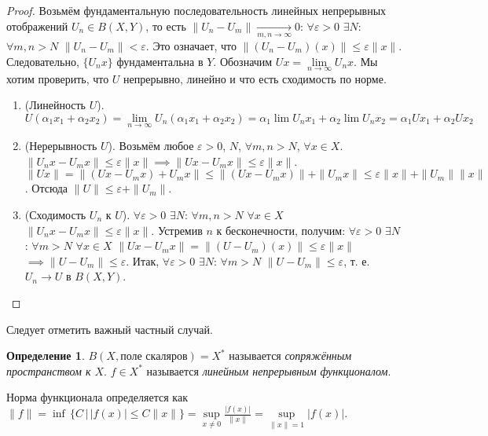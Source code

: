 \documentclass[11pt,openany,a4paper]{scrartcl}
\theoremstyle{plain}
\theoremstyle{definition}
\newtheorem{definition}[theorem]{Определение}
\newcommand{\underto}[1]{\xrightarrow[#1]{}}
\begin{document}
\begin{proof}
    Возьмём фундаментальную последовательность линейных непрерывных отображений
    $U_n \in B(X, Y)$, то есть $\|U_n - U_m\| \underto{m,n \to \infty} 0$:
    $\forall \varepsilon>0$ $\exists N:$ $\forall m,n > N$ $\|U_n - U_m\| < \varepsilon$.
    Это означает, что $\|(U_n - U_m)(x)\| \leqslant \varepsilon \|x\|$. Следовательно,
    $\{U_nx\}$ фундаментальна в $Y$. Обозначим $Ux = \lim\limits_{n \to \infty}
    U_nx$. Мы хотим проверить, что $U$ непрерывно, линейно и что есть сходимость по норме.
    \begin{enumerate}
        \item (Линейность $U$). $U(\alpha_1x_1 + \alpha_2x_2) = \lim\limits_{n \to \infty}
        U_n(\alpha_1x_1 + \alpha_2x_2) = 
        \alpha_1 \lim U_nx_1 + \alpha_2\lim U_nx_2 = \alpha_1 Ux_1 +
        \alpha_2 Ux_2$
        \item (Нерерывность $U$). Возьмём любое $\varepsilon > 0$, $N$, $\forall m,n>N$,
        $\forall x\in X$. $\|U_nx - U_mx\| \leqslant \varepsilon \|x\| \implies
        \|Ux - U_mx\| \leqslant \varepsilon\|x\|$.
        $\|Ux\| = \|(Ux - U_mx) + U_mx\| \leqslant \|(Ux - U_mx)\| + \|U_mx\| \leqslant
        \varepsilon \|x\| + \|U_m\|\|x\|$. Отсюда $\|U\| \leqslant \varepsilon +
        \|U_m\|$.
        \item (Сходимость $U_n$ к $U$).
        $\forall \varepsilon > 0$ $\exists N$: $\forall m,n>N$ $\forall x\in X$ $
        \|U_nx - U_mx\| \leqslant \varepsilon \|x\|$. Устремив $n$ к бесконечности, 
        получим: $\forall \varepsilon > 0$ $\exists N$: $\forall m > N$
        $\forall x\in X$ $\|Ux - U_mx\| = \|(U - U_m)(x)\| \leqslant \varepsilon \|x\|$
        $\implies \|U - U_m\| \leqslant \varepsilon$. Итак,
        $\forall \varepsilon > 0$ $\exists N$: $\forall m > N$
        $\|U - U_m\| \leqslant \varepsilon$, т. е. $U_n \to U$ в $B(X, Y)$.
    \end{enumerate}
\end{proof}

Следует отметить важный частный случай.
\begin{definition}
    $B (X, \text{поле скаляров}) = X^\ast$ называется
    \emph{сопряжённым пространством к $X$}. $f \in X^\ast$ называется \emph{линейным
    непрерывным функционалом}.
\end{definition}

Норма функционала определяется как $\|f\| = \inf\,\{C\,\big|\,|f(x)|
\leqslant C\|x\|\} =
\sup\limits_{x \neq 0}\frac{|f(x)|}{\|x\|} = \sup\limits_{\|x\|=1} |f(x)|$.
\end{document}
